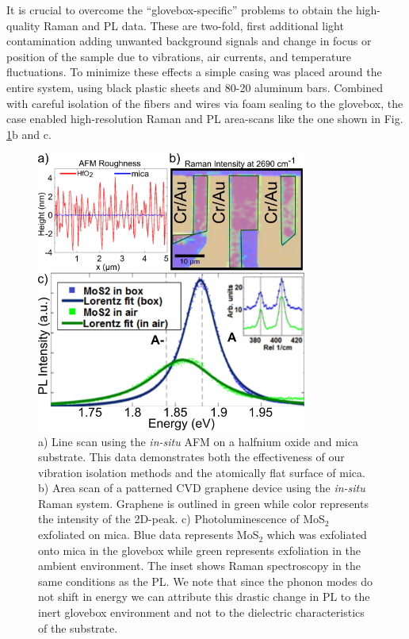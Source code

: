It is crucial to overcome the ``glovebox-specific'' problems to obtain the high-quality Raman and PL data. These are two-fold, first additional light contamination adding unwanted background signals and change in focus or position of the sample due to vibrations, air currents, and temperature fluctuations. To minimize these effects a simple casing was placed around the entire system, using black plastic sheets and 80-20 aluminum bars. Combined with careful isolation of the fibers and wires via foam sealing to the glovebox, the case enabled high-resolution Raman and PL area-scans like the one shown in Fig. \ref{fig:Characterization}b and c.
\begin{figure}
    \centering
    \includegraphics[width=88.9mm]{Chap2/Figures/CharacterizationFigure.png}
    \caption{a) Line scan using the \textit{in-situ} AFM on a halfnium oxide and mica substrate. This data demonstrates both the effectiveness of our vibration isolation methods and the atomically flat surface of mica. b) Area scan of a patterned CVD graphene device using the \textit{in-situ} Raman system. Graphene is outlined in green while color represents the intensity of the 2D-peak. c) Photoluminescence of MoS$_{2}$ exfoliated on mica. Blue data represents MoS$_{2}$ which was exfoliated onto mica in the glovebox while green represents exfoliation in the ambient environment. The inset shows Raman spectroscopy in the same conditions as the PL. We note that since the phonon modes do not shift in energy we can attribute this drastic change in PL to the inert glovebox environment and not to the dielectric characteristics of the substrate.}
    \label{fig:Characterization}
\end{figure}

